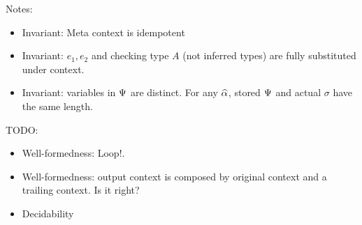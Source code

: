 Notes:
\begin{itemize}
  \item Invariant: Meta context is idempotent
  \item Invariant: $e_1, e_2$ and checking type $A$ (not inferred types) are
    fully substituted under context.
    \item Invariant: variables in $\Psi$ are distinct. For any $\widehat{\alpha}$, stored
      $\Psi$ and actual $\sigma$ have the same length.
\end{itemize}

TODO:
\begin{itemize}
  \item Well-formedness: Loop!.
  \item Well-formedness: output context is composed by original context and a
    trailing context. Is it right?
  \item Decidability
\end{itemize}

